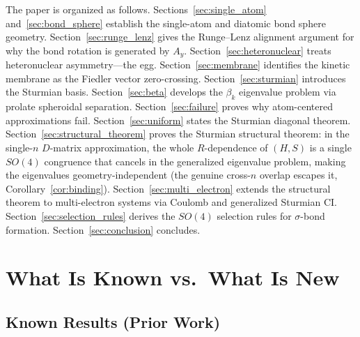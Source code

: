 \documentclass[aps,pra,twocolumn,superscriptaddress,longbibliography]{revtex4-2}
\theoremstyle{remark}
\theoremstyle{plain}
\begin{document}
The paper is organized as follows.  Sections~\ref{sec:single_atom}
and~\ref{sec:bond_sphere} establish the single-atom and diatomic bond
sphere geometry.  Section~\ref{sec:runge_lenz} gives the Runge--Lenz
alignment argument for why the bond rotation is generated by $A_y$.
Section~\ref{sec:heteronuclear} treats heteronuclear asymmetry---the
egg.  Section~\ref{sec:membrane} identifies the kinetic membrane as
the Fiedler vector zero-crossing.  Section~\ref{sec:sturmian} introduces
the Sturmian basis.  Section~\ref{sec:beta} develops the $\beta_k$
eigenvalue problem via prolate spheroidal separation.
Section~\ref{sec:failure} proves why atom-centered approximations fail.
Section~\ref{sec:uniform} states the Sturmian diagonal theorem.
Section~\ref{sec:structural_theorem} proves the Sturmian structural
theorem: in the single-$n$ $D$-matrix approximation, the whole
$R$-dependence of $(H,S)$ is a single $SO(4)$ congruence that cancels in
the generalized eigenvalue problem, making the eigenvalues
geometry-independent (the genuine cross-$n$ overlap escapes it,
Corollary~\ref{cor:binding}).
Section~\ref{sec:multi_electron} extends the structural theorem to
multi-electron systems via Coulomb and generalized Sturmian CI.
Section~\ref{sec:selection_rules} derives the $SO(4)$ selection rules
for $\sigma$-bond formation.
Section~\ref{sec:conclusion} concludes.


\section{What Is Known vs.\ What Is New}
\label{sec:attribution}

\subsection{Known Results (Prior Work)}
\end{document}
